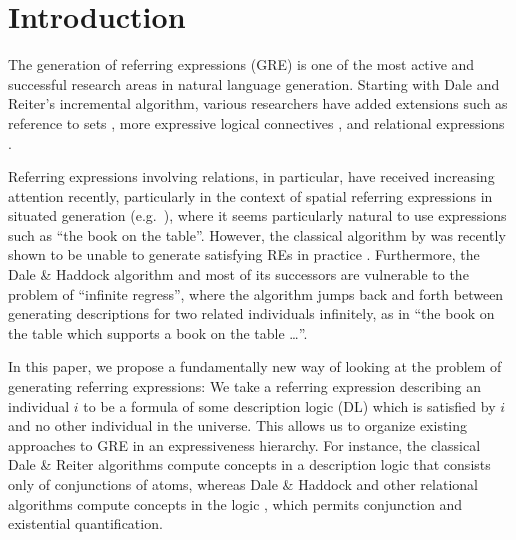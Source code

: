 \section{Introduction} \label{sec:introduction}

The generation of referring expressions (GRE) is one of the most
active and successful research areas in natural language generation.
Starting with Dale and Reiter's  incremental algorithm,
various researchers have added extensions such as reference to sets
\cite{Stone2000}, more expressive logical connectives
\cite{deemter01:_gener_refer_expres}, and relational expressions
\cite{dale91:_gener_refer_expres_invol_relat}.

Referring expressions involving relations, in particular, have
received increasing attention recently, particularly in the context of
spatial referring expressions in situated generation (e.g.\
\cite{kelleher06:_increm_gener_of_spatial_refer}), where it seems
particularly natural to use expressions such as ``the book on the
table''.  However, the classical algorithm by
 was recently shown to
be unable to generate satisfying REs in practice
\cite{viethen06:_algor_for_gener_refer_expres}.  Furthermore, the Dale
\& Haddock algorithm and most of its successors
\cite{Krahmer2003,kelleher06:_increm_gener_of_spatial_refer} are
vulnerable to the problem of ``infinite regress'', where the algorithm
jumps back and forth between generating descriptions for two related
individuals infinitely, as in ``the book on the table which supports a
book on the table \ldots''.

In this paper, we propose a fundamentally new way of looking at the
problem of generating referring expressions: We take a referring
expression describing an individual $i$ to be a formula of some
description logic (DL) which is satisfied by $i$ and no other
individual in the universe.  This allows us to organize existing
approaches to GRE in an expressiveness hierarchy.  For instance, the
classical Dale \& Reiter algorithms compute concepts in a description
logic that consists only of conjunctions of atoms, whereas Dale \&
Haddock and other relational algorithms compute concepts in the logic
\el, which permits conjunction and existential quantification.

